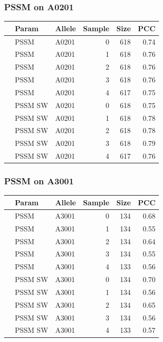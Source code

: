 \documentclass[presentation]{beamer}   %
\begin{document}
\begin{frame}
\frametitle{PSSM on A0201}
\begin{table}\scriptsize
\begin{center}
\begin{tabular}{rllrrr}
  \hline
 & Param & Allele & Sample & Size & PCC \\ 
  \hline
 & PSSM & A0201 &   0 & 618 & 0.74 \\ 
 & PSSM & A0201 &   1 & 618 & 0.76 \\ 
 & PSSM & A0201 &   2 & 618 & 0.76 \\ 
 & PSSM & A0201 &   3 & 618 & 0.76 \\ 
 & PSSM & A0201 &   4 & 617 & 0.75 \\ 
\hline
 & PSSM SW & A0201 &   0 & 618 & 0.75 \\ 
 & PSSM SW & A0201 &   1 & 618 & 0.78 \\ 
 & PSSM SW & A0201 &   2 & 618 & 0.78 \\ 
 & PSSM SW & A0201 &   3 & 618 & 0.79 \\ 
 & PSSM SW & A0201 &   4 & 617 & 0.76 \\ 
   \hline
\end{tabular}
\end{center}
\end{table}
\end{frame}

\begin{frame}
\frametitle{PSSM on A3001}
\begin{table}\scriptsize
\begin{center}
\begin{tabular}{rllrrr}
  \hline
 & Param & Allele & Sample & Size & PCC \\ 
  \hline
   & PSSM & A3001 &   0 & 134 & 0.68 \\ 
   & PSSM & A3001 &   1 & 134 & 0.55 \\ 
   & PSSM & A3001 &   2 & 134 & 0.64 \\ 
   & PSSM & A3001 &   3 & 134 & 0.55 \\ 
   & PSSM & A3001 &   4 & 133 & 0.56 \\ 
  \hline
   & PSSM SW & A3001 &   0 & 134 & 0.70 \\ 
   & PSSM SW & A3001 &   1 & 134 & 0.56 \\ 
   & PSSM SW & A3001 &   2 & 134 & 0.65 \\ 
   & PSSM SW & A3001 &   3 & 134 & 0.56 \\ 
   & PSSM SW & A3001 &   4 & 133 & 0.57 \\ 
   \hline
\end{tabular}
\end{center}
\end{table}
\end{frame}
\end{document}
